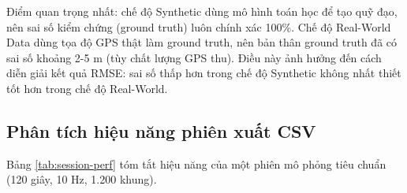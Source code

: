 \begin{table}[H]
\centering
\caption{So sánh chế độ Synthetic và Real-World Data từ dữ liệu CSV}
\label{tab:mode-compare-csv}
\end{table}

Điểm quan trọng nhất: chế độ Synthetic dùng mô hình toán học để tạo quỹ đạo, nên sai số kiểm chứng (ground truth) luôn chính xác 100\%. Chế độ Real-World Data dùng tọa độ GPS thật làm ground truth, nên bản thân ground truth đã có sai số khoảng 2-5 m (tùy chất lượng GPS thu). Điều này ảnh hưởng đến cách diễn giải kết quả RMSE: sai số thấp hơn trong chế độ Synthetic không nhất thiết tốt hơn trong chế độ Real-World.

\subsection{Phân tích hiệu năng phiên xuất CSV}

\hspace{0.5cm} Bảng \ref{tab:session-perf} tóm tắt hiệu năng của một phiên mô phỏng tiêu chuẩn (120 giây, 10 Hz, 1.200 khung).

